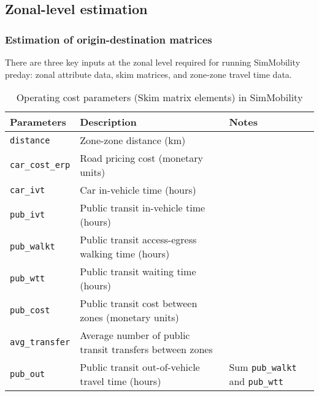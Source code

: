 \documentclass[11pt,twoside]{article}
\numberwithin{equation}{section}
\newcommand{\?}{\stackrel{?}{=}}
\begin{document}
\subsection{Zonal-level  estimation}
\subsubsection{Estimation of origin-destination matrices}
There are three key inputs at the zonal level required for running SimMobility preday: zonal attribute data, skim matrices, and zone-zone travel time data.


\begin{table}[h!]\small
  \centering
  \begin{tabular}{l l l } \toprule
    \textbf{Parameters}            & \textbf{Description}  & \textbf{Notes} \\ \midrule
    \texttt{distance}     & Zone-zone distance (km) & \\
    \texttt{car\_cost\_erp} & Road pricing cost (monetary units) &  \\
    \texttt{car\_ivt}     & Car in-vehicle time  (hours) & \\
    \texttt{pub\_ivt}     & Public transit in-vehicle time (hours) & \\
    \texttt{pub\_walkt}   & Public transit access-egress walking time (hours) & \\
    \texttt{pub\_wtt}     & Public transit waiting time (hours) & \\
    \texttt{pub\_cost}    & Public transit cost between zones (monetary units) & \\
    \texttt{avg\_transfer}& Average number of public transit transfers between zones & \\
    \texttt{pub\_out}     & Public transit out-of-vehicle travel time (hours) & Sum  \texttt{pub\_walkt} and  \texttt{pub\_wtt} \\ \bottomrule
  \end{tabular}
  \caption{Operating cost parameters (Skim matrix elements) in SimMobility}
  \label{tab:opcosts}
\end{table}
\end{document}
